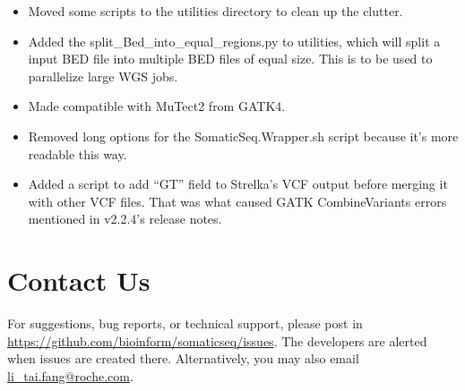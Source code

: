 \documentclass[10pt,letterpaper]{article}
\begin{document}
\begin{sloppypar}
\begin{itemize}
  
  \item
  Moved some scripts to the utilities directory to clean up the clutter.
  
  \item
  Added the split\_Bed\_into\_equal\_regions.py to utilities, which will split a input BED file into multiple BED files of equal size. This is to be used to parallelize large WGS jobs.
  
  \item
  Made compatible with MuTect2 from GATK4.
  
  \item
  Removed long options for the SomaticSeq.Wrapper.sh script because it's more readable this way.
  
  \item
  Added a script to add ``GT'' field to Strelka's VCF output before merging it with other VCF files. That was what caused GATK CombineVariants errors mentioned in v2.2.4's release notes. 

\end{itemize}





\section{Contact Us}
For suggestions, bug reports, or technical support, please post in \href{https://github.com/bioinform/somaticseq/issues}{https://github.com/bioinform/somaticseq/issues}. The developers are alerted when issues are created there. Alternatively, you may also email \href{mailto:li_tai.fang@roche.com}{li\_tai.fang@roche.com}. 

\end{sloppypar}
\end{document}
